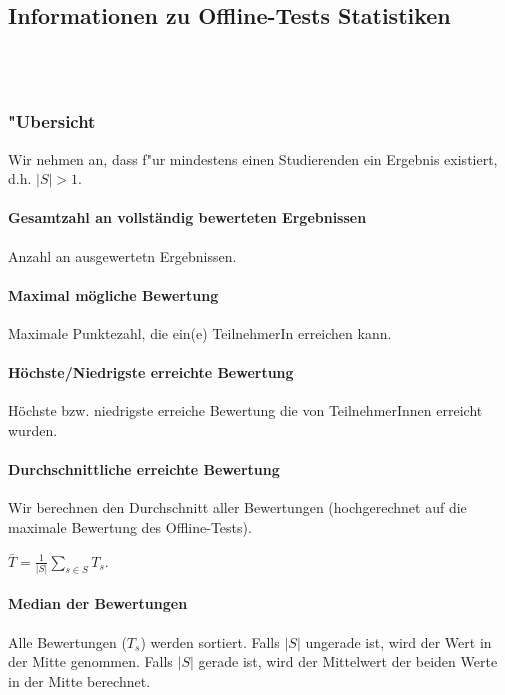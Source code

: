 \documentclass[12pt]{report}
\begin{document}
\subsection{Informationen zu Offline-Tests Statistiken}

\ \\
\ \\

\subsubsection{"Ubersicht}
\label{subsubsec:overview}

Wir nehmen an, dass f"ur mindestens einen Studierenden ein Ergebnis existiert, d.h. $|S|>1$.

\paragraph{Gesamtzahl an vollständig bewerteten Ergebnissen}
Anzahl an ausgewertetn Ergebnissen.

\paragraph{Maximal mögliche Bewertung}
Maximale Punktezahl, die ein(e) TeilnehmerIn erreichen kann.

\paragraph{Höchste/Niedrigste erreichte Bewertung}
Höchste bzw. niedrigste erreiche Bewertung die von TeilnehmerInnen erreicht wurden.

\paragraph{Durchschnittliche erreichte Bewertung}
Wir berechnen den Durchschnitt aller Bewertungen (hochgerechnet auf die maximale Bewertung des Offline-Tests).

$\bar{T}=\frac{1}{|S|}\sum\limits_{s\in S}T_s$.

\paragraph{Median der Bewertungen}
Alle Bewertungen ($T_s$) werden sortiert. Falls $|S|$ ungerade ist, wird der Wert in der Mitte genommen. Falls $|S|$ gerade ist, wird der Mittelwert der beiden Werte in der Mitte berechnet. 
\end{document}

